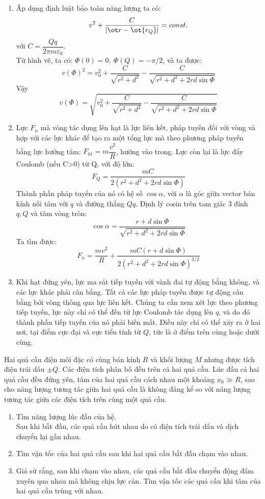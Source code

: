 \begin{loigiai}
\begin{enumerate}[1)]
    \item Áp dụng định luật bảo toàn năng lượng ta có:
    $$v^2+\dfrac{C}{\left| {\ot r - \ot {r_Q}} \right|}=const.$$
    với $C=\dfrac{Qq}{2\pi m \varepsilon_0}$.
    \\Từ hình vẽ, ta có: $\Phi(0)=0,~\Phi(Q)=-\pi/2$, và ta được:
    $$v(\Phi)^2=v_0^2+\dfrac{C}{\sqrt{r^2+d^2}}-\dfrac{C}{\sqrt{r^2+d^2+2rd\sin{\Phi}}}$$
    Vậy
    $$v(\Phi)=\sqrt{v_0^2+\dfrac{C}{\sqrt{r^2+d^2}}-\dfrac{C}{\sqrt{r^2+d^2+2rd\sin{\Phi}}}}$$
    \item Lực $F_n$ mà vòng tác dụng lên hạt là lực liên kết, pháp tuyến đối với vòng và hợp với các lực khác để tạo ra một tổng lực mà theo phương pháp tuyến bằng lực hướng tâm: $F_{ht}=m\dfrac{v^2}{R}$, hướng vào trong. Lực còn lại là lực đẩy Coulomb (nếu C>0) từ Q, với độ lớn:
    $$F_Q=\dfrac{mC}{2(r^2+d^2+2rd\sin{\Phi})}$$
    Thành phần pháp tuyến của nó có hệ số $\cos{\alpha}$, với $\alpha$ là góc giữa vector bán kính nối tâm với $q$ và đường thẳng $Qq$. Định lý cosin trên tam giác 3 đỉnh $q,Q$ và tâm vòng tròn:
    $$\cos{\alpha}=\dfrac{r+d\sin{\Phi}}{\sqrt{r^2+d^2+2rd\sin{\Phi}}}$$
    Ta tìm được:
    $$F_n=\dfrac{mv^2}{R}+\dfrac{mC(r+d\sin{\Phi})}{2({r^2+d^2+2rd\sin{\Phi}})^{3/2}}$$
    \item Khi hạt đứng yên, lực ma sát tiếp tuyến với vành đai tự động bằng không, và các lực khác phải cân bằng. Tất cả các lực pháp tuyến được tự động cân bằng bởi vòng thông qua lực liên kết. Chúng ta cần xem xét lực theo phương tiếp tuyến, lực này chỉ có thể đến từ lực Coulomb tác dụng lên $q$, và do đó thành phần tiếp tuyến của nó phải biến mất. Điều này chỉ có thể xảy ra ở hai nơi, tại điểm cực đại và cực tiểu tính từ $Q$, tức là ở điểm trên cùng hoặc dưới cùng.
    \end{enumerate}
\end{loigiai}
    \begin{vd}
    Hai quả cầu điện môi đặc có cùng bán kính $R$ và khối lượng $M$ nhưng được tích điện trái dấu $\pm Q$. Các điện tích phân bố đều trên cả hai quả cầu. Lúc đầu cả hai quả cầu đều đứng yên, tâm của hai quả cầu cách nhau một khoảng $x_0\gg R$, sao cho năng lượng tương tác giữa hai quả cầu là không đáng kể so với năng lượng tương tác giữa các điện tích trên cùng một quả cầu.
    \begin{enumerate}[1)]
    \setlength{\itemsep}{0pt}
        \item Tìm năng lượng lúc đầu của hệ.\\
        Sau khi bắt đầu, các quả cầu hút nhau do có điện tích trái dấu và dịch chuyển lại gần nhau.
        \item Tìm vận tốc của hai quả cầu sau khi hai quả cầu bắt đầu chạm vào nhau.
        \item Giả sử rằng, sau khi chạm vào nhau, các quả cầu bắt đầu chuyển động đâm xuyên qua nhau mà không chịu lực cản. Tìm vận tốc các quả cầu khi tâm của hai quả cầu trùng với nhau.
    \end{enumerate}
    \end{vd}
